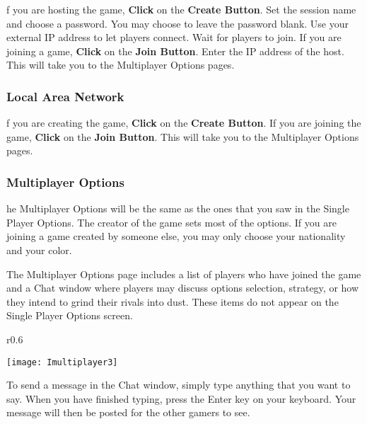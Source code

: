 f you are hosting the game, \textbf{Click} on the \textbf{Create Button}. Set the session name and choose a password. You may choose to leave the password blank. Use your external IP address to let players connect. Wait for players to join. If you are joining a game, \textbf{Click} on the \textbf{Join Button}. Enter the IP address of the host. This will take you to the Multiplayer Options pages.

\subsubsection{\textsf{Local Area Network}}

f you are creating the game, \textbf{Click} on the \textbf{Create Button}. If you are joining the game, \textbf{Click} on the \textbf{Join Button}. This will take you to the Multiplayer Options pages.

\subsubsection{\textsf{Multiplayer Options}}

he Multiplayer Options will be the same as the ones that you saw in the Single Player Options. The creator of the game sets most of the options. If you are joining a game created by someone else, you may only choose your nationality and your color.


The Multiplayer Options page includes a list of players who have joined the game and a Chat window where players may discuss options selection, strategy, or how they intend to grind their rivals into dust. These items do not appear on the Single Player Options screen.

\begin{wrapfigure}{r}{0.6\textwidth}
	\begin{center}
		\vspace{-20pt}
		\texttt{[image: Imultiplayer3]} %
	\end{center}
	\vspace{-20pt}
\end{wrapfigure}


To send a message in the Chat window, simply type anything that you want to say. When you have finished typing, press the Enter key on your keyboard. Your message will then be posted for the other gamers to see.

